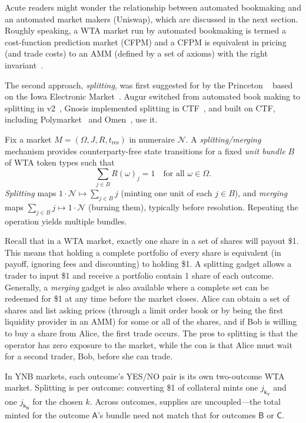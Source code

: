 Acute readers might wonder the relationship between automated bookmaking and  an automated market makers (\eg Uniswap), which are discussed in the next section. Roughly speaking, a WTA market run by automated bookmaking is termed a cost-function prediction market (CFPM) and a CFPM is equivalent in pricing (and trade costs) to an AMM (defined by a set of axioms) with the right invariant~\cite{FPW23}.

The second approach, \textit{splitting}, was first suggested for \depms by the Princeton \depm~\cite{BCFKMN14} based on the Iowa Electronic Market~\cite{iem}. Augur switched from automated book making to splitting in v2~\cite{AKPWZ19}, Gnosis implemented splitting in CTF~\cite{ctf}, and \depms built on CTF, including Polymarket~\cite{poly} and Omen~\cite{Omen_docs}, use it.

\begin{definition}\label{def:splitmerge}
Fix a market $M=(\Omega,J,R,t_{\mathrm{res}})$ in numeraire $\mathcal{N}$. A \emph{splitting/merging} mechanism provides counterparty-free state transitions for a fixed \emph{unit bundle} $B$ of WTA token types such that
\[
\sum_{j\in B} R(\omega)_j = 1 \quad\text{for all }\omega\in\Omega.
\]
\emph{Splitting} maps $1\cdot\mathcal{N}\mapsto \sum_{j\in B} j$ (minting one unit of each $j\in B$), and \emph{merging} maps $\sum_{j\in B} j \mapsto 1\cdot\mathcal{N}$ (burning them), typically before resolution. Repeating the operation yields multiple bundles.
\end{definition}

Recall that in a WTA market, exactly one share in a set of shares will payout \$1. This means that holding a complete portfolio of every share is equivalent (in payoff, ignoring fees and discounting) to holding \$1. A splitting gadget allows a trader to input \$1 and receive a portfolio contain 1 share of each outcome. Generally, a \textit{merging} gadget is also available where a complete set can be redeemed for \$1 at any time before the market closes. Alice can obtain a set of shares and list asking prices (through a limit order book or by being the first liquidity provider in an AMM) for some or all of the shares, and if Bob is willing to buy a share from Alice, the first trade occurs. The pros to splitting is that the operator has zero exposure to the market, while the con is that Alice must wait for a second trader, Bob, before she can trade. 

In YNB markets, each outcome’s YES/NO pair is its own two-outcome WTA market. Splitting is per outcome: converting \$1 of collateral mints one $j_{\mathsf{k_Y}}$ and one $j_{\mathsf{k_N}}$ for the chosen $k$. Across outcomes, supplies are uncoupled---the total minted for the outcome $\mathsf{A}$'s bundle need not match that for outcomes $\mathsf{B}$ or $\mathsf{C}$. 

